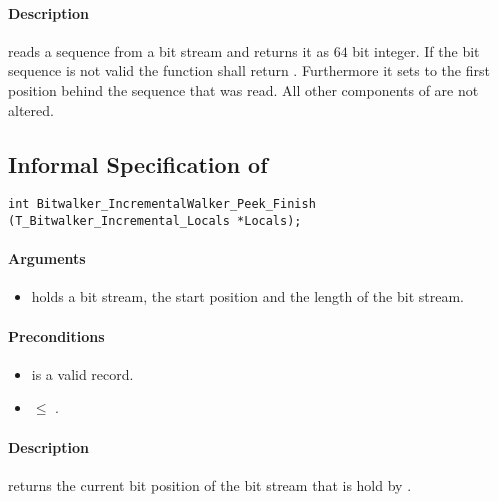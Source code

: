 \paragraph{Description}

\peeknext reads a sequence from a bit stream and  returns it as $64$ bit integer. If the bit sequence is not valid the function shall return . Furthermore  it sets  to the first position behind the sequence that was read. All other components of  are not altered.




\clearpage

\subsection{Informal Specification of }

\begin{lstlisting}[style=acsl-block]
int Bitwalker_IncrementalWalker_Peek_Finish (T_Bitwalker_Incremental_Locals *Locals);
\end{lstlisting}

\paragraph{Arguments}

\begin{itemize}
    \item  {} holds a bit stream, the start position and the length of the bit stream.
\end{itemize}

\paragraph{Preconditions}
\begin{itemize}
    \item  {} is a valid record.
    \item {} $\leq $ .
\end{itemize}

\paragraph{Description}

\peekfinish  returns the current bit position of the bit stream that is hold by .

